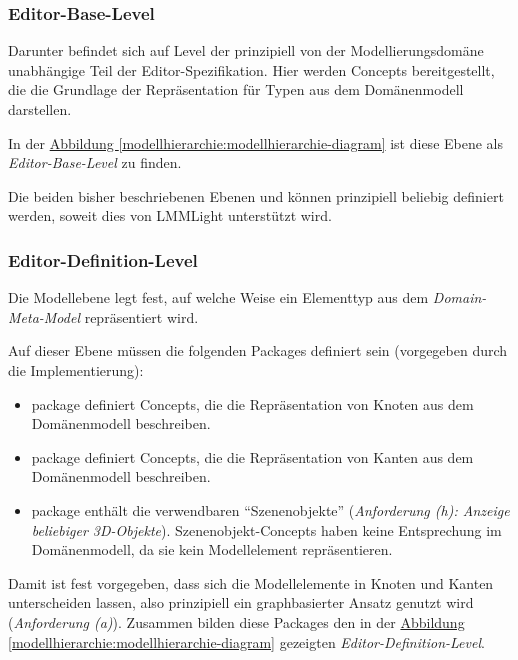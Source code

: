 \documentclass[a4paper,10pt]{sphinxmanual}
\begin{document}
\subsubsection{Editor-Base-Level}
\label{modellhierarchie:editor-base-level}
Darunter befindet sich auf Level  der prinzipiell von der Modellierungsdomäne unabhängige Teil der Editor-Spezifikation.
Hier werden Concepts bereitgestellt, die die Grundlage der Repräsentation für Typen aus dem Domänenmodell darstellen.

In der \hyperref[modellhierarchie:modellhierarchie-diagram]{Abbildung  \ref*{modellhierarchie:modellhierarchie-diagram}} ist diese Ebene als \emph{Editor-Base-Level} zu finden.

Die beiden bisher beschriebenen Ebenen  und  können prinzipiell beliebig definiert werden, soweit dies von LMMLight unterstützt wird.


\subsubsection{Editor-Definition-Level}
\label{modellhierarchie:editor-definition-level}\label{modellhierarchie:edef}
Die Modellebene  legt fest, auf welche Weise ein Elementtyp aus dem \emph{Domain-Meta-Model} repräsentiert wird.

Auf dieser Ebene müssen die folgenden Packages definiert sein (vorgegeben durch die Implementierung):
\begin{itemize}
\item {} 
package  definiert Concepts, die die Repräsentation von Knoten aus dem Domänenmodell beschreiben.

\item {} 
package  definiert Concepts, die die Repräsentation von Kanten aus dem Domänenmodell beschreiben.

\item {} 
package  enthält die verwendbaren "`Szenenobjekte"' (\emph{Anforderung (h): Anzeige beliebiger 3D-Objekte}). Szenenobjekt-Concepts haben keine Entsprechung im Domänenmodell, da sie kein Modellelement repräsentieren.

\end{itemize}

Damit ist fest vorgegeben, dass sich die Modellelemente in Knoten und Kanten unterscheiden lassen, also prinzipiell ein graphbasierter Ansatz genutzt wird (\emph{Anforderung (a)}).
Zusammen bilden diese Packages den in der \hyperref[modellhierarchie:modellhierarchie-diagram]{Abbildung  \ref*{modellhierarchie:modellhierarchie-diagram}} gezeigten \emph{Editor-Definition-Level}.
\end{document}
